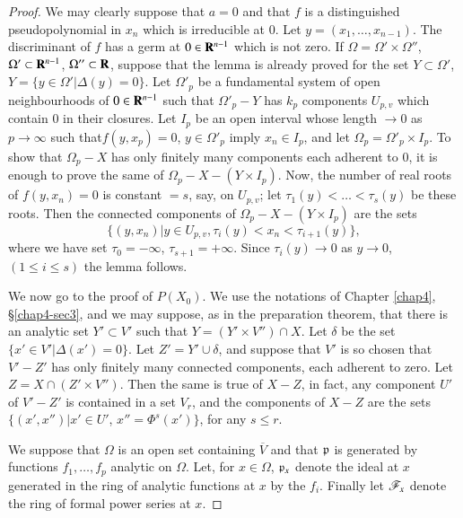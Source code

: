 \begin{proof}
We may clearly suppose that $a=0$ and that $f$ is a distinguished pseudopolynomial in $x_{n}$ which is irreducible at $0$. Let $y=(x_{1},\ldots,x_{n-1})$. The discriminant of $f$ has a germ at $0\in \mathbf{R}^{n-1}$ which is not zero. If $\Omega=\Omega'\times \Omega''$, $\Omega'\subset \mathbf{R}^{n-1}$, $\Omega''\subset \mathbf{R}$, suppose that the lemma is already proved for the set $Y\subset \Omega'$, $Y=\{y\in \Omega'|\Delta (y)=0\}$. Let $\Omega'_{p}$ be a fundamental system of open neighbourhoods of $0\in \mathbf{R}^{n-1}$ such that $\Omega'_{p}-Y$ has $k_{p}$ components $U_{p,v}$ which contain $0$ in their closures. Let $I_{p}$ be an open interval whose length $\to 0$ as $p\to \infty$ such that\pageoriginale $f(y,x_{p})=0$, $y\in \Omega'_{p}$ imply $x_{n}\in I_{p}$, and let $\Omega_{p}=\Omega'_{p}\times I_{p}$. To show that $\Omega_{p}-X$ has only finitely many components each adherent to $0$, it is enough to prove the same of $\Omega_{p}-X-(Y\times I_{p})$. Now, the number of real roots of $f(y,x_{n})=0$ is constant $=s$, say, on $U_{p,v}$; let $\tau_{1}(y)<\ldots<\tau_{s}(y)$ be these roots. Then the connected components of $\Omega_{p}-X-(Y\times I_{p})$ are the sets
$$
\{(y,x_{n})|y\in U_{p,v},\tau_{i}(y)<x_{n}<\tau_{i+1}(y)\},
$$
where we have set $\tau_{0}=-\infty$, $\tau_{s+1}=+\infty$. Since $\tau_{i}(y)\to 0$ as $y\to 0$, $(1\leq i\leq s)$ the lemma follows.

We now go to the proof of $P(X_{0})$. We use the notations of Chapter \ref{chap4}, \S\ref{chap4-sec3}, and we may suppose, as in the preparation theorem, that there is an analytic set $Y'\subset V'$ such that $Y=(Y'\times V'')\cap X$. Let $\delta$ be the set $\{x'\in V'|\Delta(x')=0\}$. Let $Z'=Y'\cup \delta$, and suppose that $V'$ is so chosen that $V'-Z'$ has only finitely many connected components, each adherent to zero. Let $Z=X\cap (Z'\times V'')$. Then the same is true of $X-Z$, in fact, any component $U'$ of $V'-Z'$ is contained in a set $V_{r}$, and the components of $X-Z$ are the sets $\{(x',x'')|x'\in U'$, $x''=\Phi^{s}(x')\}$, for any $s\leq r$.

We suppose that $\Omega$ is an open set containing $\overline{V}$ and that $\mathfrak{p}$ is generated by functions $f_{1},\ldots,f_{p}$ analytic on $\Omega$. Let, for $x\in \Omega$, $\mathfrak{p}_{x}$ denote the ideal at $x$ generated in the ring of analytic functions at $x$ by the $f_{i}$. Finally let $\mathscr{F}_{x}$ denote the ring of formal power series at $x$.
\end{proof}

